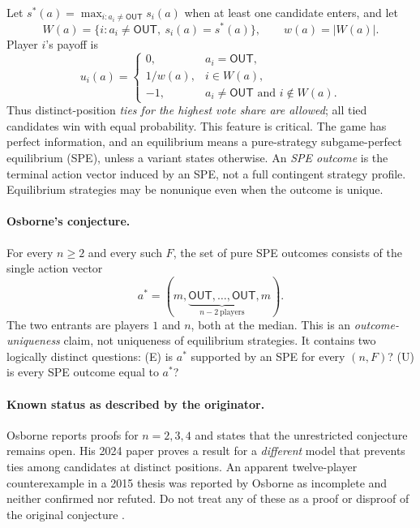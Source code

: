\documentclass[11pt]{article}
\newcommand{\OUT}{\mathsf{OUT}}
\begin{document}
Let $s^*(a)=\max_{i:a_i\ne\OUT}s_i(a)$ when at least one candidate enters, and let
\[
 W(a)=\{i:a_i\ne\OUT,\ s_i(a)=s^*(a)\},\qquad w(a)=|W(a)|.
\]
Player $i$'s payoff is
\[
 u_i(a)=\begin{cases}
 0,&a_i=\OUT,\\
 1/w(a),&i\in W(a),\\
 -1,&a_i\ne\OUT\text{ and }i\notin W(a).
 \end{cases}
\]
Thus distinct-position \emph{ties for the highest vote share are allowed}; all tied candidates win with equal probability. This feature is critical. The game has perfect information, and an equilibrium means a pure-strategy subgame-perfect equilibrium (SPE), unless a variant states otherwise. An \emph{SPE outcome} is the terminal action vector induced by an SPE, not a full contingent strategy profile. Equilibrium strategies may be nonunique even when the outcome is unique.

\paragraph{Osborne's conjecture.}
For every $n\ge2$ and every such $F$, the set of pure SPE outcomes consists of the single action vector
\[
 \boxed{a^*=(m,\underbrace{\OUT,\ldots,\OUT}_{n-2\ \text{players}},m).}
\]
The two entrants are players $1$ and $n$, both at the median. This is an \emph{outcome-uniqueness} claim, not uniqueness of equilibrium strategies. It contains two logically distinct questions: (E) is $a^*$ supported by an SPE for every $(n,F)$? (U) is every SPE outcome equal to $a^*$?

\paragraph{Known status as described by the originator.}
Osborne reports proofs for $n=2,3,4$ and states that the unrestricted conjecture remains open. His 2024 paper proves a result for a \emph{different} model that prevents ties among candidates at distinct positions. An apparent twelve-player counterexample in a 2015 thesis was reported by Osborne as incomplete and neither confirmed nor refuted. Do not treat any of these as a proof or disproof of the original conjecture \cite{OsborneWeb,Osborne2024}.
\end{document}
